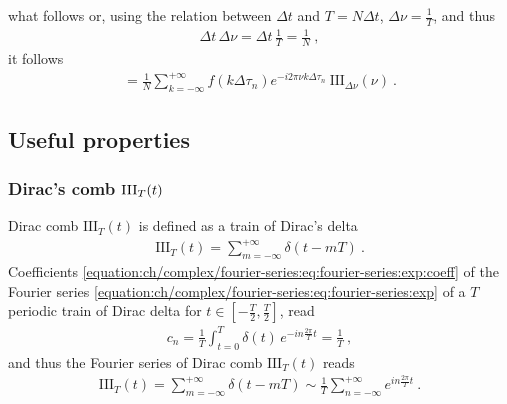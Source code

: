 \documentclass[letterpaper,10pt,english]{jupyterBook}
\begin{document}
\sphinxAtStartPar
   what follows
or, using the relation between \(\Delta t\) and \(T = N \Delta t\), \(\Delta \nu = \frac{1}{T}\), and thus
\begin{equation*}
\begin{split}\Delta t \, \Delta \nu = \Delta t \, \frac{1}{T} = \frac{1}{N} \ ,\end{split}
\end{equation*}
\sphinxAtStartPar
it follows
\begin{equation*}
\begin{split}
 = \frac{1}{N} \sum_{k=-\infty}^{+\infty} f(k \Delta \tau_n) e^{-i 2 \pi \nu k \Delta \tau_n} \ \text{III}_{\Delta \nu}(\nu) \ .
\end{split}
\end{equation*}



\subsection{Useful properties}
\label{\detokenize{ch/complex/fourier-transforms:useful-properties}}\label{\detokenize{ch/complex/fourier-transforms:complex-fourier-useful-properties}}

\subsubsection{Dirac’s comb \protect\(\text{III}_T(t)\protect\)}
\label{\detokenize{ch/complex/fourier-transforms:dirac-s-comb-text-iii-t-t}}\label{\detokenize{ch/complex/fourier-transforms:complex-fourier-useful-properties-dirac-comb}}
\sphinxAtStartPar
Dirac comb \(\text{III}_T(t)\) is defined as a train of Dirac’s delta
\begin{equation*}
\begin{split}\text{III}_T(t) = \sum_{m=-\infty}^{+\infty} \delta(t-mT) \ .\end{split}
\end{equation*}
\sphinxAtStartPar
Coefficients \eqref{equation:ch/complex/fourier-series:eq:fourier-series:exp:coeff} of the Fourier series \eqref{equation:ch/complex/fourier-series:eq:fourier-series:exp} of a \(T\)\sphinxhyphen{}periodic train of Dirac delta for \(t \in \left[-\frac{T}{2}, \frac{T}{2} \right]\), read
\begin{equation*}
\begin{split}c_n = \frac{1}{T} \int_{t=0}^{T} \delta(t) \, e^{-i n \frac{2\pi}{T} t} = \frac{1}{T} \ ,\end{split}
\end{equation*}
\sphinxAtStartPar
and thus the Fourier series of Dirac comb \(\text{III}_T(t)\) reads
\begin{equation*}
\begin{split}\text{III}_T(t) = \sum_{m=-\infty}^{+\infty} \delta(t-mT) \sim \frac{1}{T} \sum_{n=-\infty}^{+\infty} e^{i n \frac{2\pi}{T} t} \ .\end{split}
\end{equation*}
\end{document}
